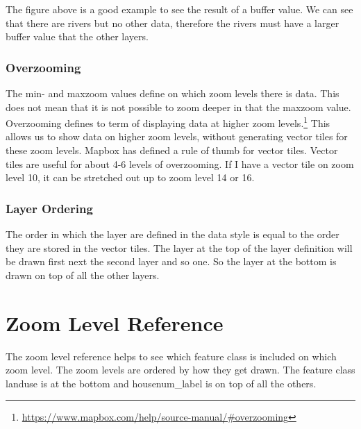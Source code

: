 The figure above is a good example to see the result of a buffer value. We can see that there are rivers but no other data, therefore the rivers must have a larger buffer value that the other layers.

\subsubsection{Overzooming}\label{overzooming}
The min- and maxzoom values define on which zoom levels there is data. This does not mean that it is not possible to zoom deeper in that the maxzoom value.
Overzooming defines to term of displaying data at higher zoom levels.\footnote{\url{https://www.mapbox.com/help/source-manual/\#overzooming}}
This allows us to show data on higher zoom levels, without generating vector tiles for these zoom levels.
Mapbox has defined a rule of thumb for vector tiles. Vector tiles are useful for about 4-6 levels of overzooming. If I have a vector tile on zoom level 10, it can be stretched out up to zoom level 14 or 16.  

\subsubsection{Layer Ordering}\label{layer_ordering}
The order in which the layer are defined in the data style is equal to the order they are stored in the vector tiles.
The layer at the top of the layer definition will be drawn first next the second layer and so one. So the layer at the bottom is drawn on top of all the other layers. 


\section{Zoom Level Reference}\label{zoomlevel_reference}
The zoom level reference helps to see which feature class is included on which zoom level. The zoom levels are ordered by how they get drawn. The feature class landuse is at the bottom and housenum\_label is on top of all the others. 

